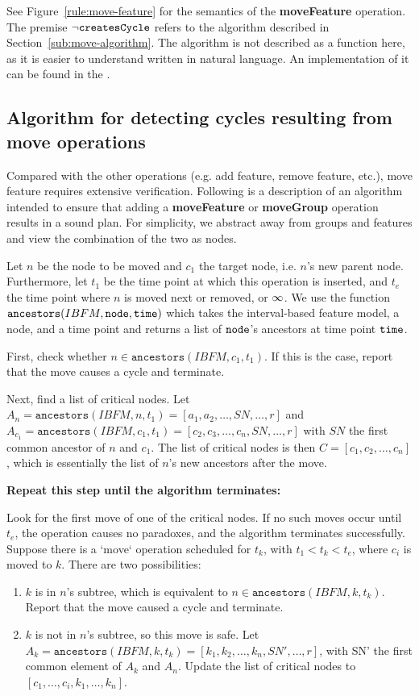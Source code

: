 See Figure~\vref{rule:move-feature} for the semantics of the \textbf{moveFeature} operation. The premise $\neg \texttt{createsCycle}$ refers to the algorithm described in Section~\vref{sub:move-algorithm}. The algorithm is not described as a function here, as it is easier to understand written in natural language. An implementation of it can be found in the . 

\subsection{Algorithm for detecting cycles resulting from \textbf{move} operations}
\label{sub:move-algorithm}

Compared with the other operations (e.g. add feature, remove feature, etc.), move feature requires extensive verification. Following is a description of an algorithm intended to ensure that adding a \textbf{moveFeature} or \textbf{moveGroup} operation results in a sound plan. For simplicity, we abstract away from groups and features and view the combination of the two as nodes. 

Let $n$ be the node to be moved and $c_1$ the target node, i.e. $n$'s new parent node. Furthermore, let $t_1$ be the time point at which this operation is inserted, and $t_e$ the time point where $n$ is moved next or removed, or $\infty$. We use the function $\texttt{ancestors}(IBFM, \texttt{node}, \texttt{time})$ which takes the interval-based feature model, a node, and a time point and returns a list of $\texttt{node}$'s ancestors at time point $\texttt{time}$. 

First, check whether $n \in \texttt{ancestors}(IBFM, c_1, t_1)$. If this is the case, report that the move causes a cycle and terminate. 

Next, find a list of critical nodes. 
Let $A_n = \texttt{ancestors}(IBFM, n, t_1) = [a_1, a_2, \dots, SN, \dots, r]$ and $A_{c_1} = \texttt{ancestors}(IBFM, c_1, t_1) = [c_2, c_3, \dots, c_n, SN, \dots, r]$ with $SN$ the first common ancestor of $n$ and $c_1$. The list of critical nodes is then $C = [c_1, c_2, \dots, c_n]$, which is essentially the list of $n$'s new ancestors after the move. 

\textbf{Repeat this step until the algorithm terminates:}

Look for the first move of one of the critical nodes. If no such moves occur until $t_e$, the operation causes no paradoxes, and the algorithm terminates successfully.  
  Suppose there is a `move` operation scheduled for $t_k$, with $t_1 < t_k < t_e$, where $c_i$ is moved to $k$. There are two possibilities:  
  \begin{enumerate}
    \item $k$ is in $n$'s subtree, which is equivalent to $n \in \texttt{ancestors}(IBFM, k, t_k)$. Report that the move caused a cycle and terminate. 
\item $k$ is not in $n$'s subtree, so this move is safe. Let $A_k = \texttt{ancestors}(IBFM, k, t_k) = [k_1, k_2, \dots, k_n, SN', \dots, r]$, with SN' the first common element of $A_k$ and $A_n$. Update the list of critical nodes to $[c_1, \dots, c_i, k_1, \dots, k_n]$.
  \end{enumerate}

